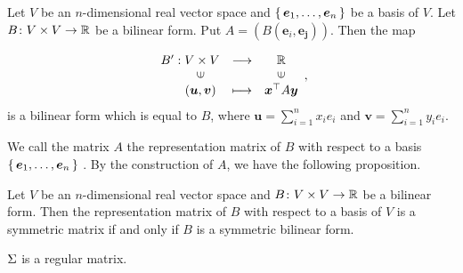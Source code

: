 \documentclass{article}
\begin{document}
\begin{thm}
Let $V$ be an $n$-dimensional real vector space and $\set{\bm{e}_1, \dots, \bm{e}_n}$ be a basis of $V$. Let  $B\colon V\times V \rightarrow \mathbb{R}$ be a bilinear form. Put $A = (B(\bm{e}_i, \bm{e_j}))$. Then the map 

\[
\begin{array}{ccc}
B':V \times V  & \longrightarrow & \R\\
\ \ \ \ \  \rotatebox{90}{$\in$}    &                 & \rotatebox{90}{$\in$} \\
\ \ \ \ \ (\bm{u}, \bm{v})                   & \longmapsto     & \bm{x}^{\top} A\bm{y}
\end{array},
\]
is a bilinear form which is equal to $B$, where $\bm{u}=\sum_{i=1}^n x_i e_i$ and $\bm{v}=\sum_{i=1}^n y_i e_i$.
\end{thm}
We call the matrix $A$ the representation matrix of $B$ with respect to a basis  $\set{\bm{e}_1, \dots, \bm{e}_n}$ .  By the construction of $A$, we have the following proposition.
\begin{prop}
Let $V$ be an $n$-dimensional real vector space and   $B\colon V\times V \rightarrow \mathbb{R}$ be a bilinear form. Then the representation matrix of $B$ with respect to a basis of $V$ is a symmetric matrix if and only if $B$ is a symmetric bilinear form.
\end{prop} 
\begin{thm}\label{thm:Sigma-is-regular}
$\Sigma$ is a regular matrix.
\end{thm}
\end{document}
